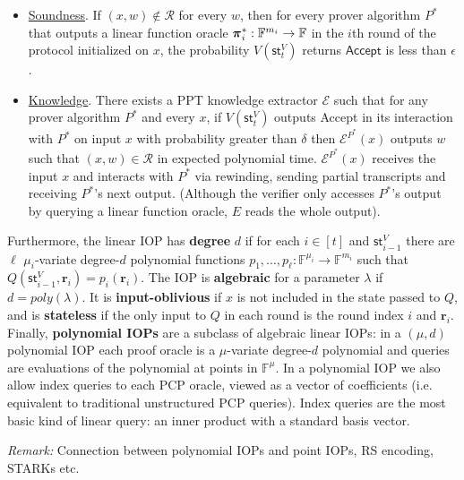 \begin{definition} 
\begin{itemize}
\item \underline{Soundness}. If $(x, w) \notin \mathcal{R}$ for every $w$, then for every prover algorithm $P^*$ that outputs a linear function oracle $\boldsymbol{\pi}^*_i: \mathbb{F}^{m_i} \rightarrow \mathbb{F}$ in the $i$th round of the protocol initialized on $x$, the probability $V(\textsf{st}^V_t)$ returns $\textsf{Accept}$ is less than $\epsilon$. 

\item \underline{Knowledge}. There exists a PPT knowledge extractor $\mathcal{E}$ such that for any prover algorithm $P^*$ and every $x$, if $V(\textsf{st}^V_t)$ outputs \textsf{Accept} in its interaction with $P^*$ on input $x$ with probability greater than $\delta$ then $\mathcal{E}^{P^*}(x)$ outputs $w$ such that $(x, w) \in \mathcal{R}$ in expected polynomial time. $\mathcal{E}^{P^*}(x)$ receives the input $x$ and interacts with $P^*$ via rewinding, sending partial transcripts and receiving $P^*$'s next output. (Although the verifier only accesses $P^*$'s output by querying a linear function oracle, $E$ reads the whole output). 

\end{itemize}

Furthermore, the linear IOP has \textbf{degree} $d$ if for each $i \in [t]$ and $\textsf{st}^V_{i-1}$ there are $\ell$ $\mu_i$-variate degree-$d$ polynomial functions $p_1,...,p_\ell: \mathbb{F}^{\mu_i} \rightarrow \mathbb{F}^{m_i}$ such that $Q(\textsf{st}^V_{i-1}, \mathbf{r}_i) = p_i(\mathbf{r}_i)$. The IOP is \textbf{algebraic} for a parameter $\lambda$ if $d = poly(\lambda)$. 
It is \textbf{input-oblivious} if $x$ is not included in the state passed to $Q$, and is \textbf{stateless} if the only input to $Q$ in each round is the round index $i$ and $\mathbf{r}_i$.
Finally, \textbf{polynomial IOPs} are a subclass of algebraic linear IOPs: in a $(\mu, d)$ polynomial IOP each proof oracle is a $\mu$-variate degree-$d$ polynomial and queries are evaluations of the polynomial at points in $\mathbb{F}^\mu$. In a polynomial IOP we also allow index queries to each PCP oracle, viewed as a vector of coefficients (i.e. equivalent to traditional unstructured PCP queries). Index queries are the most basic kind of linear query: an inner product with a standard basis vector. 

\end{definition} 

\emph{Remark:} Connection between polynomial IOPs and point IOPs, RS encoding, STARKs etc. 

